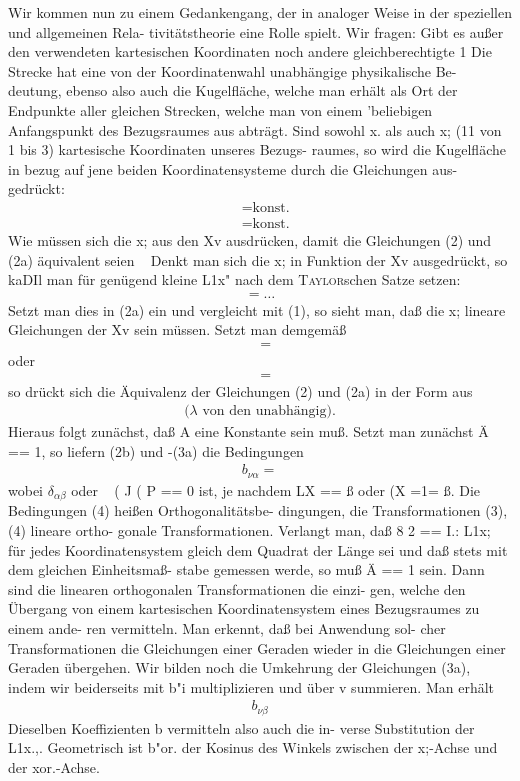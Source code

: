 Wir kommen nun zu einem Gedankengang, der in
analoger Weise in der speziellen und allgemeinen Rela-
tivitätstheorie eine Rolle spielt. Wir fragen: Gibt es
außer den verwendeten kartesischen Koordinaten noch
andere gleichberechtigte 1 Die Strecke hat eine von
der Koordinatenwahl unabhängige physikalische Be-
deutung, ebenso also auch die Kugelfläche, welche man
erhält als Ort der Endpunkte aller gleichen Strecken,
welche man von einem 'beliebigen Anfangspunkt des
Bezugsraumes aus abträgt. Sind sowohl x. als auch x;
(11 von 1 bis 3) kartesische Koordinaten unseres Bezugs-
raumes, so wird die Kugelfläche in bezug auf jene
beiden Koordinatensysteme durch die Gleichungen aus-
gedrückt:
\begin{align}
    &= \text{konst.}
    \\
    &= \text{konst.}
    \tag{(2a)}
\end{align}
Wie müssen sich die x; aus den Xv ausdrücken, damit die
Gleichungen (2) und (2a) äquivalent seien
~
Denkt man
sich die x; in Funktion der Xv ausgedrückt, so kaDIl man
für genügend kleine L1x" nach dem \textsc{Taylor}schen Satze
setzen:
\begin{align}
    = \ldots
\end{align}
Setzt man dies in (2a) ein und vergleicht mit (1), so sieht
man, daß die x; lineare Gleichungen der Xv sein müssen.
Setzt man demgemäß
\begin{align}
    &=
\end{align}
oder
\begin{align}
    &=
    \tag{(3a)}
\end{align}
so drückt sich die Äquivalenz der Gleichungen (2) und
(2a) in der Form aus
\begin{align}
    \text{($\lambda$ von den unabhängig)}.
    \tag{(3b)}
\end{align}
Hieraus folgt zunächst, daß A eine Konstante sein muß.
Setzt man zunächst Ä == 1, so liefern (2b) und -(3a) die
Bedingungen
\begin{align}
    b_{\nu \alpha} =
\end{align}
wobei $\delta_{\alpha\beta}$ oder ~ ( J ( P == 0 ist, je nachdem LX == ß oder
(X =1= ß. Die Bedingungen (4) heißen Orthogonalitätsbe-
dingungen, die Transformationen (3), (4) lineare ortho-
gonale Transformationen. Verlangt man, daß 8 2 == I.: L1x;
für jedes Koordinatensystem gleich dem Quadrat der
Länge sei und daß stets mit dem gleichen Einheitsmaß-
stabe gemessen werde, so muß Ä == 1 sein. Dann sind
die linearen orthogonalen Transformationen die einzi-
gen, welche den Übergang von einem kartesischen
Koordinatensystem eines Bezugsraumes zu einem ande-
ren vermitteln. Man erkennt, daß bei Anwendung sol-
cher Transformationen die Gleichungen einer Geraden
wieder in die Gleichungen einer Geraden übergehen.
Wir bilden noch die Umkehrung der Gleichungen (3a),
indem wir beiderseits mit b"i multiplizieren und über v
summieren. Man erhält
\begin{align}
    b_{\nu\beta}
\end{align}
Dieselben Koeffizienten b vermitteln also auch die in-
verse Substitution der L1x.,. Geometrisch ist b"or. der
Kosinus des Winkels zwischen der x;-Achse und der
xor.-Achse.


